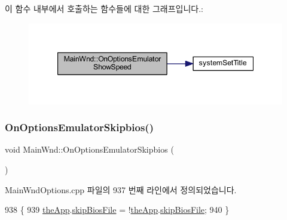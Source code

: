 이 함수 내부에서 호출하는 함수들에 대한 그래프입니다.\+:
\nopagebreak
\begin{figure}[H]
\begin{center}
\leavevmode
\includegraphics[width=347pt]{class_main_wnd_a5f538c28cfe7007a8dd651215f6e4768_cgraph}
\end{center}
\end{figure}
\mbox{\label{class_main_wnd_a41f8561c0b900be55957b1b6be4b6930}} 
\subsubsection{\texorpdfstring{On\+Options\+Emulator\+Skipbios()}{OnOptionsEmulatorSkipbios()}}
{\footnotesize\ttfamily void Main\+Wnd\+::\+On\+Options\+Emulator\+Skipbios (\begin{DoxyParamCaption}{ }\end{DoxyParamCaption})\hspace{0.3cm}{\ttfamily [protected]}}



Main\+Wnd\+Options.\+cpp 파일의 937 번째 라인에서 정의되었습니다.


\begin{DoxyCode}
938 \{
939   \mbox{\hyperlink{_v_b_a_8cpp_a8095a9d06b37a7efe3723f3218ad8fb3}{theApp}}.\mbox{\hyperlink{class_v_b_a_a5cb340a521f9f53bf082a63b26fbda25}{skipBiosFile}} = !\mbox{\hyperlink{_v_b_a_8cpp_a8095a9d06b37a7efe3723f3218ad8fb3}{theApp}}.\mbox{\hyperlink{class_v_b_a_a5cb340a521f9f53bf082a63b26fbda25}{skipBiosFile}};
940 \}
\end{DoxyCode}
\mbox{\label{class_main_wnd_a3c88d3d358d76bb7ef362fa7c4b1be4b}} 
